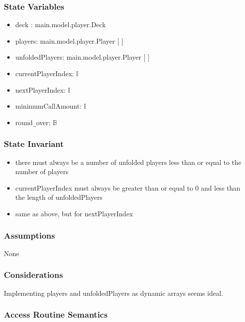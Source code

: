 \documentclass[12pt, titlepage]{article}
\begin{document}
\subsubsection* {State Variables}

\begin{itemize}
    \item deck : main.model.player.Deck
    \item players: main.model.player.Player [ ]
    \item unfoldedPlayers: main.model.player.Player [ ]
    \item currentPlayerIndex: $\mathbb{I}$
    \item nextPlayerIndex: $\mathbb{I}$
    \item minimumCallAmount: $\mathbb{I}$
    \item round\verb|_|over: $\mathbb{B}$
\end{itemize}

\subsubsection* {State Invariant}

\begin{itemize}
    \item there must always be a number of unfolded players less than or equal to the number of players
    \item currentPlayerIndex must always be greater than or equal to 0 and less than the length of unfoldedPlayers
    \item same as above, but for nextPlayerIndex
\end{itemize}

\subsubsection* {Assumptions}

None

\subsubsection* {Considerations}

Implementing players and unfoldedPlayers as dynamic arrays seems ideal.

\subsubsection* {Access Routine Semantics}
\end{document}

